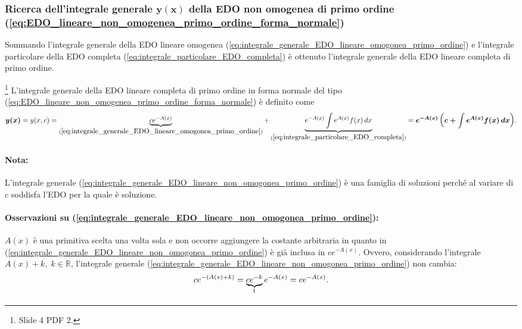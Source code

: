 \subsubsection{Ricerca dell'integrale generale \texorpdfstring{$\boldsymbol{y(x)}$}{y(x)} della EDO non omogenea di primo ordine (\ref{eq:EDO_lineare_non_omogenea_primo_ordine_forma_normale})} Sommando l'integrale generale della EDO lineare omogenea (\ref{eq:integrale_generale_EDO_lineare_omogonea_primo_ordine}) e l'integrale particolare della EDO completa (\ref{eq:integrale_particolare_EDO_completa}) è ottenuto l'integrale generale della EDO lineare completa di primo ordine.
\begin{definition}\footnote{Slide 4 PDF 2.}
    L'integrale generale della EDO lineare completa di primo ordine in forma normale del tipo (\ref{eq:EDO_lineare_non_omogenea_primo_ordine_forma_normale}) è definito come
    \begin{equation}\label{eq:integrale_generale_EDO_lineare_non_omogonea_primo_ordine}
        \boldsymbol{y(x)}=y(x,c)=\underbrace{ce^{-A(x)}}_{(\ref{eq:integrale_generale_EDO_lineare_omogonea_primo_ordine})}+\underbrace{e^{-A(x)}\int e^{A(x)}f(x)\, dx}_{(\ref{eq:integrale_particolare_EDO_completa})} = \boldsymbol{e^{-A(x)}\left(c + \int e^{A(x)}f(x)\, dx\right)}.
    \end{equation}
\end{definition}

\paragraph{Nota:} L'integrale generale (\ref{eq:integrale_generale_EDO_lineare_non_omogonea_primo_ordine}) è una famiglia di soluzioni perché al variare di $c$ soddisfa l'EDO per la quale è soluzione.

\paragraph{Osservazioni su (\ref{eq:integrale_generale_EDO_lineare_non_omogonea_primo_ordine}):} $A(x)$ è una primitiva scelta una volta sola e non occorre aggiungere la costante arbitraria in quanto in (\ref{eq:integrale_generale_EDO_lineare_non_omogonea_primo_ordine}) è già inclusa in $ce^{-A(x)}$. Ovvero, considerando l'integrale $A(x)+k,\; k\in\mathbb R$, l'integrale generale (\ref{eq:integrale_generale_EDO_lineare_non_omogonea_primo_ordine}) non cambia:
\begin{equation*}
    ce^{-(A(x)+k)}=\underbrace{ce^{-k}}_{\footnotemark}e^{-A(x)}=c e^{-A(x)}.
\end{equation*}

